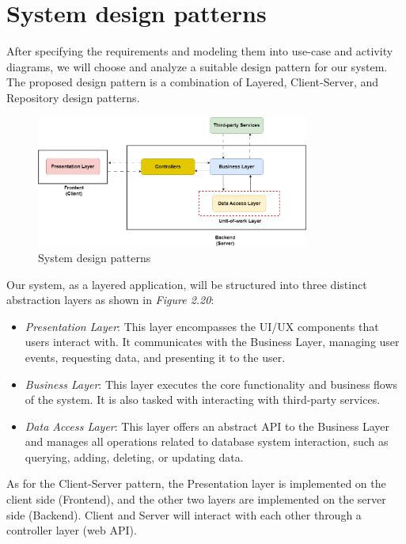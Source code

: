 \section{System design patterns}

After specifying the requirements and modeling them into use-case and activity diagrams, we will choose and analyze a suitable design pattern for our system. The proposed design pattern is a combination of Layered, Client-Server, and Repository design patterns.

\begin{figure}[H]
    \centering
    \includegraphics[width=0.8\textwidth]{Figures/design_pattern.png}
    \caption{System design patterns}
\end{figure}

Our system, as a layered application, will be structured into three distinct abstraction layers as shown in \textit{Figure 2.20}:


\begin{itemize}
    \item
          \emph{Presentation Layer}: This layer encompasses the UI/UX components that users interact with. It communicates with the Business Layer, managing user events, requesting data, and presenting it to the user.
    \item
          \emph{Business Layer}: This layer executes the core functionality and business flows of the system. It is also tasked with interacting with third-party services.
    \item
          \emph{Data Access Layer}: This layer offers an abstract API to the Business Layer and manages all operations related to database system interaction, such as querying, adding, deleting, or updating data.
\end{itemize}

As for the Client-Server pattern, the Presentation layer is implemented on the client side (Frontend), and the other two layers are implemented on the server side (Backend). Client and Server will interact with each other through a controller layer (web API).


